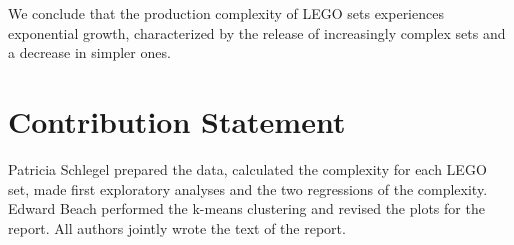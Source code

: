 \documentclass{article}
\theoremstyle{plain}
\theoremstyle{definition}
\theoremstyle{remark}
\begin{document}
We conclude that the production complexity of LEGO sets experiences exponential growth, characterized by the release of increasingly complex sets and a decrease in simpler ones.

\section*{Contribution Statement}

Patricia Schlegel prepared the data, calculated the complexity for each LEGO set, made first exploratory analyses and the two regressions of the complexity. Edward Beach performed the k-means clustering and revised the plots for the report. All authors jointly wrote the text of the report.




\end{document}
